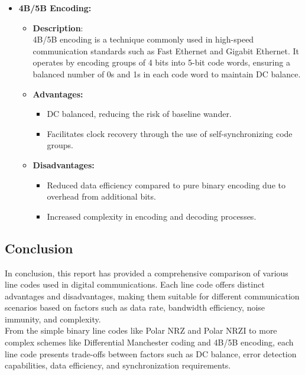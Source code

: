 \documentclass[a4paper, 12pt, english]{article}
\begin{document}
\begin{itemize}
    \item \textbf{4B/5B Encoding:}
        \begin{itemize}
            \item \textbf{Description}: \\
            4B/5B encoding is a technique commonly used in high-speed communication standards such as Fast Ethernet and Gigabit Ethernet. It operates by encoding groups of 4 bits into 5-bit code words, ensuring a balanced number of 0s and 1s in each code word to maintain DC balance.
            \item \textbf{Advantages:}
                \begin{itemize}
                    \item DC balanced, reducing the risk of baseline wander.
                    \item Facilitates clock recovery through the use of self-synchronizing code groups.
                \end{itemize}
            \item \textbf{Disadvantages:}
                \begin{itemize}
                    \item Reduced data efficiency compared to pure binary encoding due to overhead from additional bits.
                    \item Increased complexity in encoding and decoding processes.
                \end{itemize}
        \end{itemize}
\end{itemize}




\null\newpage
\subsection{Conclusion}

In conclusion, this report has provided a comprehensive comparison of various line codes used in digital communications. Each line code offers distinct advantages and disadvantages, making them suitable for different communication scenarios based on factors such as data rate, bandwidth efficiency, noise immunity, and complexity. \\

From the simple binary line codes like Polar NRZ and Polar NRZI to more complex schemes like Differential Manchester coding and 4B/5B encoding, each line code presents trade-offs between factors such as DC balance, error detection capabilities, data efficiency, and synchronization requirements. \\
\end{document}

